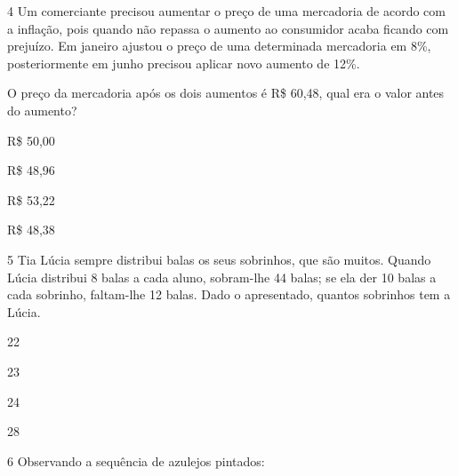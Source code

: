 \num{4} Um comerciante precisou aumentar o preço de uma mercadoria de acordo com a inflação, pois quando não repassa o aumento ao consumidor acaba ficando com prejuízo. Em janeiro ajustou o preço de uma determinada mercadoria em 8\%, posteriormente em junho precisou aplicar novo aumento de 12\%.

O preço da mercadoria após os dois aumentos é R\$ 60,48, qual era o
valor antes do aumento?

\begin{escolha}

\item
  R\$ 50,00
\item
  R\$ 48,96
\item
  R\$ 53,22
\item
  R\$ 48,38
\end{escolha}


\num{5} Tia Lúcia sempre distribui balas os seus sobrinhos, que são muitos. Quando Lúcia distribui 8 balas a cada aluno, sobram-lhe 44 balas; se ela der 10 balas a cada sobrinho, faltam-lhe 12 balas. Dado o apresentado, quantos sobrinhos tem a Lúcia.

\begin{multicols}{2}
\begin{escolha}
\item 22

\item 23

\item 24

\item 28
\end{escolha}
\end{multicols}

\num{6} Observando a sequência de azulejos pintados:


